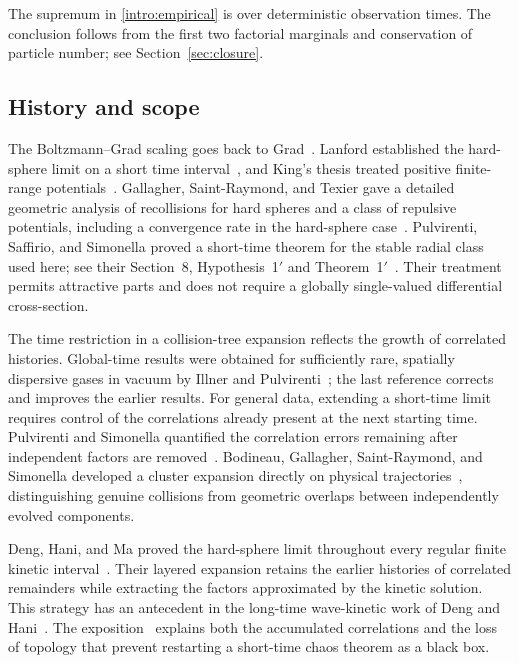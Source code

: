 The supremum in \eqref{intro:empirical} is over deterministic
observation times. The conclusion follows from the first two factorial
marginals and conservation of particle number; see
Section~\ref{sec:closure}.

\subsection{History and scope}

The Boltzmann--Grad scaling goes back to Grad~\cite{Grad49,Grad58}.
Lanford established the hard-sphere limit on a short time
interval~\cite{Lanford75}, and King's thesis treated positive
finite-range potentials~\cite{King75}.
Gallagher, Saint-Raymond, and Texier gave a detailed geometric analysis
of recollisions for hard spheres and a class of repulsive potentials,
including a convergence rate in the hard-sphere case~\cite{GST14}.
Pulvirenti, Saffirio, and Simonella proved a short-time theorem for the
stable radial class used here; see their Section~8, Hypothesis~1$'$ and
Theorem~1$'$~\cite{PSS14}. Their treatment permits attractive parts and
does not require a globally single-valued differential cross-section.

The time restriction in a collision-tree expansion reflects the growth
of correlated histories. Global-time results were obtained for
sufficiently rare, spatially dispersive gases in vacuum by Illner and
Pulvirenti~\cite{IllnerPulvirenti86,Pulvirenti87,IllnerPulvirenti89};
the last reference corrects and improves the earlier results.
For general data, extending a short-time limit requires control of the
correlations already present at the next starting time.
Pulvirenti and Simonella quantified the correlation errors remaining
after independent factors are removed~\cite{PulvirentiSimonella2017}.
Bodineau, Gallagher, Saint-Raymond, and Simonella developed a cluster
expansion directly on physical trajectories~\cite{BGSSCluster2022},
distinguishing genuine collisions from geometric overlaps between
independently evolved components.

Deng, Hani, and Ma proved the hard-sphere limit throughout every regular
finite kinetic interval~\cite[Theorem~1]{DHM25}. Their layered expansion
retains the earlier histories of correlated remainders while extracting
the factors approximated by the kinetic solution. This strategy has an
antecedent in the long-time wave-kinetic work of Deng and
Hani~\cite{DengHani2024}. The exposition~\cite{BGSS26} explains both the
accumulated correlations and the loss of topology that prevent
restarting a short-time chaos theorem as a black box.

